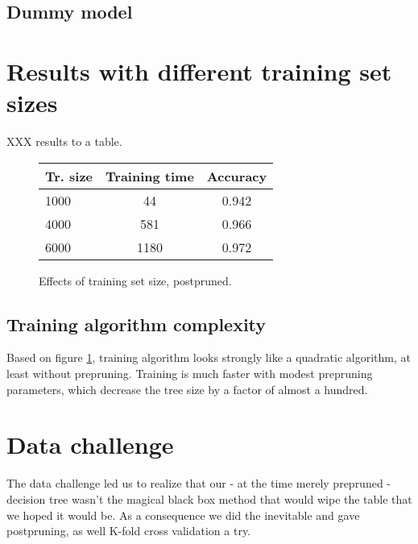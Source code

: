 \documentclass[a4paper,10pt]{article}
\begin{document}
\subsection{Dummy model}


\section{Results with different training set sizes}

XXX results to a table.
\begin{figure}
  \centering
\begin{tabular}{|l|c|c|}
\hline
Tr. size & Training time & Accuracy \\ \hline
1000 & 44 & 0.942 \\
4000 & 581 & 0.966 \\
6000 & 1180 & 0.972 \\
\hline
\end{tabular}
  \caption{Effects of training set size, postpruned.}
  \label{fig:training-data-size} 
\end{figure}

% 
% 
% 

\subsection{Training algorithm complexity}

Based on figure \ref{fig:training-data-size}, training algorithm looks
strongly like a quadratic algorithm, at least without prepruning.
Training is much faster with modest prepruning parameters, which
decrease the tree size by a factor of almost a hundred.

\section{Data challenge}


The data challenge led us to realize that our - at the time merely
prepruned - decision tree wasn't the magical black box method
that would wipe the table that we hoped it would be.
As a consequence we did the inevitable and gave postpruning,
as well K-fold cross validation a try.
\end{document}
